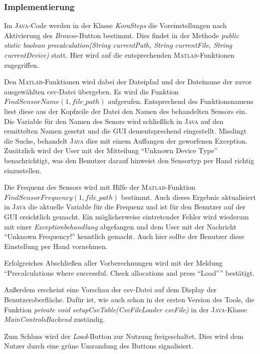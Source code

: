 \documentclass[onecolumn,german]{article}
\begin{document}
\subsubsection{Implementierung}

Im \textsc{Java}-Code werden in der Klasse \textit{KoraSteps} die Voreinstellungen nach Aktivierung des \textit{Browse}-Button bestimmt. Dies findet in der Methode \textit{public static boolean precalculation(String currentPath, String currentFile, String currentDevice)} statt. Hier wird auf die entsprechenden \textsc{Matlab}-Funktionen zugegriffen.\newline

Den \textsc{Matlab}-Funktionen wird dabei der Dateipfad und der Dateiname der zuvor ausgewählten csv-Datei übergeben. Es wird die Funktion \textit{$FindSensorName(1, file\_path)$} aufgerufen. Entsprechend des Funktionsnamens liest diese aus der Kopfzeile der Datei den Namen des behandelten Sensors ein. Die Variable für den Namen des Senors wird schließlich in \textsc{Java} auf den ermittelten Namen gesetzt und die GUI dementsprechend eingestellt. Misslingt die Suche, behandelt \textsc{Java} dies mit einem Auffangen der geworfenen Exception. Zusätzlich wird der User mit der Mitteilung ``Unknown Device Type'' benachrichtigt, was den Benutzer darauf hinweist den Sensortyp per Hand richtig einzustellen.

Die Frequenz des Sensors wird mit Hilfe der \textsc{Matlab}-Funktion \textit{$FindSensorFrequency(1, file\_path)$} bestimmt. Auch dieses Ergebnis aktualisiert in \textsc{Java} die aktuelle Variable für die Frequenz und ist für den Benutzer auf der GUI ersichtlich gemacht. Ein möglicherweise eintretender Fehler wird wiederum mit einer \textit{Exceptionbehandlung} abgefangen und dem User mit der Nachricht ``Unknown Frequency!'' kenntlich gemacht. Auch hier sollte der Benutzer diese Einstellung per Hand vornehmen.

Erfolgreiches Abschließen aller Vorberechnungen wird mit der Meldung ``Precalculations where successful. Check allocations and press ``Load'''' bestätigt.

Außerdem erscheint eine Vorschau der csv-Datei auf dem Display der Benutzeroberfläche. Dafür ist, wie auch schon in der ersten Version des Tools, die Funktion \textit{private void setupCsvTable(CsvFileLoader csvFile)} in der \textsc{Java}-Klasse \textit{MainControlsBackend} zuständig.

Zum Schluss wird der \textit{Load}-Button zur Nutzung freigeschaltet. Dies wird dem Nutzer durch eine grüne Umrandung des Buttons signalisiert.
\end{document}
